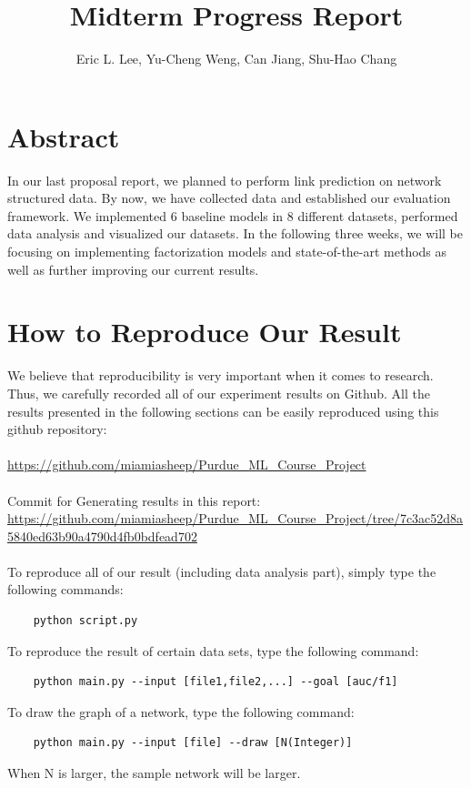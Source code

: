 \documentclass[12pt]{article}
\begin{document}
 
	\title{Midterm Progress Report}
	\author{Eric L. Lee, Yu-Cheng Weng, Can Jiang, Shu-Hao Chang} 
	\maketitle
	
	\section{Abstract}
	
	In our last proposal report, we planned to perform link prediction on network structured data.
	By now, we have collected data and established our evaluation framework. We implemented 6 baseline models in 8 different datasets, performed data analysis and visualized our datasets. In the following three weeks, we will be focusing on implementing factorization models and state-of-the-art methods as well as further improving our current results. 
	
	\section{How to Reproduce Our Result}
	We believe that reproducibility is very important when it comes to research. Thus, we carefully recorded all of our experiment results on Github. All the results presented in the following sections can be easily reproduced using this github repository: 
	\\
	\\
	\url{https://github.com/miamiasheep/Purdue\_ML\_Course\_Project}
	\\
	\\
	Commit for Generating results in this report: \\
	\url{https://github.com/miamiasheep/Purdue_ML_Course_Project/tree/7c3ac52d8a5840ed63b90a4790d4fb0bdfead702}
	\\
	\\
	To reproduce all of our result (including data analysis part), simply type the following commands: 
	\begin{lstlisting}
	python script.py
	\end{lstlisting}
	To reproduce the result of certain data sets, type the following command:
	\begin{lstlisting}
	python main.py --input [file1,file2,...] --goal [auc/f1]
	\end{lstlisting}
	To draw the graph of a network, type the following command:
	\begin{lstlisting}
	python main.py --input [file] --draw [N(Integer)]
	\end{lstlisting}
	When N is larger, the sample network will be larger.
	
\end{document}

